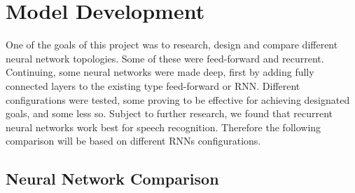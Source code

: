 \chapter{Model Development}\label{ch:model_development}
One of the goals of this project was to research, design and compare different neural network topologies. 
Some of these were feed-forward and recurrent.
Continuing, some neural networks were made deep, first by adding fully connected layers to the existing type feed-forward or RNN.
Different configurations were tested, some proving to be effective for achieving designated goals, and some less so.
Subject to further research, we found that recurrent neural networks work best for speech recognition.
Therefore  the following comparison will be based on different RNNs configurations.
\section{Neural Network Comparison}\label{sec:NNComparison}


